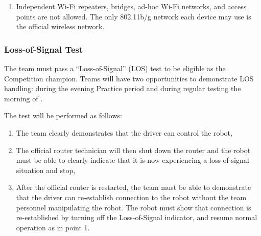 \begin{enumerate}
\item Independent Wi-Fi repeaters, bridges, ad-hoc Wi-Fi networks, and access points are not allowed. The only 802.11b/g network each device may use is the official wireless network.
\end{enumerate}

\subsubsection{Loss-of-Signal Test}
\label{los}
The team must pass a “Loss-of-Signal” (LOS) test to be eligible as the Competition champion. Teams will have two opportunities to demonstrate LOS handling: \textbf{\los} during the evening Practice period and during regular testing the morning of \textbf{\competition}.

The test will be performed as follows:

\begin{enumerate}
\item The team clearly demonstrates that the driver can control the robot,
\item The official router technician will then shut down the router and the robot must be able to clearly indicate that it is now experiencing a loss-of-signal situation and stop,
\item After the official router is restarted, the team must be able to demonstrate that the driver can re-establish connection to the robot without the team personnel manipulating the robot. The robot must show that connection is re-established by turning off the Loss-of-Signal indicator, and resume normal operation as in point 1.
\end{enumerate}
